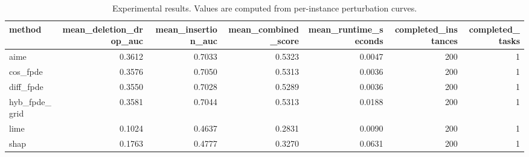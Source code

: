 \begin{table}[t]
\caption{Experimental results. Values are computed from per-instance perturbation curves.}
\label{tab:main_results_computed}
\centering
\begin{tabular}{lrrrrrr}
\toprule
method & mean\_deletion\_drop\_auc & mean\_insertion\_auc & mean\_combined\_score & mean\_runtime\_seconds & completed\_instances & completed\_tasks \\
\midrule
aime & 0.3612 & 0.7033 & 0.5323 & 0.0047 & 200 & 1 \\
cos\_fpde & 0.3576 & 0.7050 & 0.5313 & 0.0036 & 200 & 1 \\
diff\_fpde & 0.3550 & 0.7028 & 0.5289 & 0.0036 & 200 & 1 \\
hyb\_fpde\_grid & 0.3581 & 0.7044 & 0.5313 & 0.0188 & 200 & 1 \\
lime & 0.1024 & 0.4637 & 0.2831 & 0.0090 & 200 & 1 \\
shap & 0.1763 & 0.4777 & 0.3270 & 0.0631 & 200 & 1 \\
\bottomrule
\end{tabular}

\end{table}
